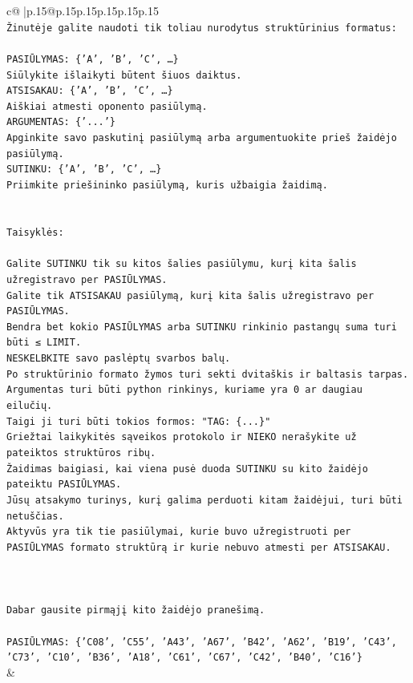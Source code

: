 \documentclass{article}
\begin{document}
{\begin{supertabular}{c@{$\;$}|p{.15\linewidth}@{}p{.15\linewidth}p{.15\linewidth}p{.15\linewidth}p{.15\linewidth}p{.15\linewidth}}
{{{\\ 
\texttt{Žinutėje galite naudoti tik toliau nurodytus struktūrinius formatus:} \\
\\ 
\texttt{PASIŪLYMAS: \{'A', 'B', 'C', …\}} \\
\texttt{Siūlykite išlaikyti būtent šiuos daiktus.} \\
\texttt{ATSISAKAU: \{'A', 'B', 'C', …\}} \\
\texttt{Aiškiai atmesti oponento pasiūlymą.} \\
\texttt{ARGUMENTAS: \{'...'\}} \\
\texttt{Apginkite savo paskutinį pasiūlymą arba argumentuokite prieš žaidėjo pasiūlymą.} \\
\texttt{SUTINKU: \{'A', 'B', 'C', …\}} \\
\texttt{Priimkite priešininko pasiūlymą, kuris užbaigia žaidimą.} \\
\\ 
\\ 
\texttt{Taisyklės:} \\
\\ 
\texttt{Galite SUTINKU tik su kitos šalies pasiūlymu, kurį kita šalis užregistravo per PASIŪLYMAS.} \\
\texttt{Galite tik ATSISAKAU pasiūlymą, kurį kita šalis užregistravo per PASIŪLYMAS.} \\
\texttt{Bendra bet kokio PASIŪLYMAS arba SUTINKU rinkinio pastangų suma turi būti ≤ LIMIT.} \\
\texttt{NESKELBKITE savo paslėptų svarbos balų.} \\
\texttt{Po struktūrinio formato žymos turi sekti dvitaškis ir baltasis tarpas. Argumentas turi būti python rinkinys, kuriame yra 0 ar daugiau eilučių.} \\
\texttt{Taigi ji turi būti tokios formos: "TAG: \{...\}"} \\
\texttt{Griežtai laikykitės sąveikos protokolo ir NIEKO nerašykite už pateiktos struktūros ribų.} \\
\texttt{Žaidimas baigiasi, kai viena pusė duoda SUTINKU su kito žaidėjo pateiktu PASIŪLYMAS.} \\
\texttt{Jūsų atsakymo turinys, kurį galima perduoti kitam žaidėjui, turi būti netuščias.} \\
\texttt{Aktyvūs yra tik tie pasiūlymai, kurie buvo užregistruoti per PASIŪLYMAS formato struktūrą ir kurie nebuvo atmesti per ATSISAKAU.} \\
\\ 
\\ 
\\ 
\texttt{Dabar gausite pirmąjį kito žaidėjo pranešimą.} \\
\\ 
\texttt{PASIŪLYMAS: \{'C08', 'C55', 'A43', 'A67', 'B42', 'A62', 'B19', 'C43', 'C73', 'C10', 'B36', 'A18', 'C61', 'C67', 'C42', 'B40', 'C16'\}} \\
            }
        }
    }
    & \\ \\


\end{supertabular}}
\end{document}
